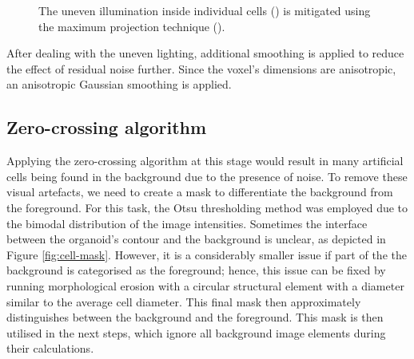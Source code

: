 \documentclass[
  digital,     %
  oneside,     %
  nosansbold,  %
  nocolorbold, %
  lof,         %
  lot,         %
]{fithesis4}
\begin{document}
\begin{figure}
\begin{subfigure}[t]{0.45\linewidth}
        \caption{}
        \label{fig:max-proj-after}
    \end{subfigure}
    \caption{The uneven illumination inside individual cells () is mitigated using the
    maximum projection technique ().}
    \label{fig:max-proj}
\end{figure}

After dealing with the uneven lighting, additional smoothing is applied
to reduce the effect of residual noise further. Since the voxel's dimensions are
anisotropic, an anisotropic Gaussian smoothing is applied.

\subsection{Zero-crossing algorithm}
Applying the zero-crossing algorithm at this stage would result in many
artificial cells being found in the background due to the presence of noise. To
remove these visual artefacts, we need to create a mask to differentiate the
background from the foreground. For this task, the Otsu thresholding method was
employed due to the bimodal distribution of the image intensities. Sometimes the interface between
the organoid's contour and the background is unclear, as depicted in Figure
\ref{fig:cell-mask}. However, it is a considerably smaller issue if part of the
the background is categorised as the foreground; hence, this issue can be fixed by
running morphological erosion with a circular structural element with a diameter similar to the average cell diameter. This final mask then approximately distinguishes between the 
background and the foreground. This mask is then utilised in the next steps, which
ignore all background image elements during their calculations.
\end{document}
